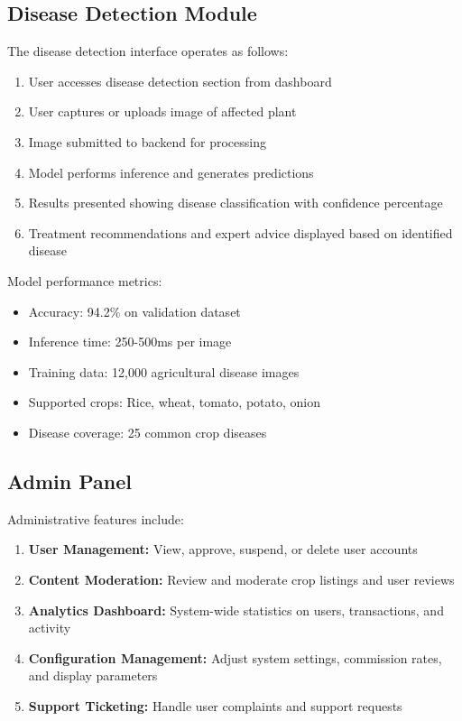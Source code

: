 \documentclass[12pt,a4paper]{report}
\begin{document}
\subsection{Disease Detection Module}

The disease detection interface operates as follows:

\begin{enumerate}
    \item User accesses disease detection section from dashboard
    \item User captures or uploads image of affected plant
    \item Image submitted to backend for processing
    \item Model performs inference and generates predictions
    \item Results presented showing disease classification with confidence percentage
    \item Treatment recommendations and expert advice displayed based on identified disease
\end{enumerate}

Model performance metrics:
\begin{itemize}
    \item Accuracy: 94.2\% on validation dataset
    \item Inference time: 250-500ms per image
    \item Training data: 12,000 agricultural disease images
    \item Supported crops: Rice, wheat, tomato, potato, onion
    \item Disease coverage: 25 common crop diseases
\end{itemize}

\subsection{Admin Panel}

Administrative features include:

\begin{enumerate}
    \item \textbf{User Management:} View, approve, suspend, or delete user accounts
    \item \textbf{Content Moderation:} Review and moderate crop listings and user reviews
    \item \textbf{Analytics Dashboard:} System-wide statistics on users, transactions, and activity
    \item \textbf{Configuration Management:} Adjust system settings, commission rates, and display parameters
    \item \textbf{Support Ticketing:} Handle user complaints and support requests
\end{enumerate}
\end{document}
